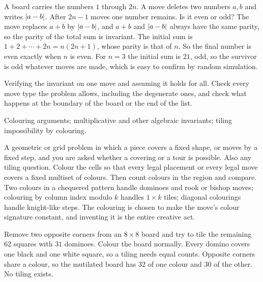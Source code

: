 \begin{worked}
A board carries the numbers $1$ through $2n$. A move deletes two numbers $a,b$ and writes $\left\lvert a-b\right\rvert$. After $2n-1$ moves one number remains. Is it even or odd? The move replaces $a+b$ by $\left\lvert a-b\right\rvert$, and $a+b$ and $\left\lvert a-b\right\rvert$ always have the same parity, so the parity of the total sum is invariant. The initial sum is $1+2+\cdots+2n=n(2n+1)$, whose parity is that of $n$. So the final number is even exactly when $n$ is even. For $n=3$ the initial sum is $21$, odd, so the survivor is odd whatever moves are made, which is easy to confirm by random simulation.
\end{worked}

\begin{trap}
Verifying the invariant on one move and assuming it holds for all. Check every move type the problem allows, including the degenerate ones, and check what happens at the boundary of the board or the end of the list.
\end{trap}

\begin{seealsob}Colouring arguments; multiplicative and other algebraic invariants; tiling impossibility by colouring.\end{seealsob}

\cue A geometric or grid problem in which a piece covers a fixed shape, or moves by a fixed step, and you are asked whether a covering or a tour is possible. Also any tiling question.
\method Colour the cells so that every legal placement or every legal move covers a fixed multiset of colours. Then count colours in the region and compare. Two colours in a chequered pattern handle dominoes and rook or bishop moves; colouring by column index modulo $k$ handles $1\times k$ tiles; diagonal colourings handle knight-like steps. The colouring is chosen to make the move's colour signature constant, and inventing it is the entire creative act.

\begin{worked}
Remove two opposite corners from an $8\times8$ board and try to tile the remaining $62$ squares with $31$ dominoes. Colour the board normally. Every domino covers one black and one white square, so a tiling needs equal counts. Opposite corners share a colour, so the mutilated board has $32$ of one colour and $30$ of the other. No tiling exists.
\end{worked}

